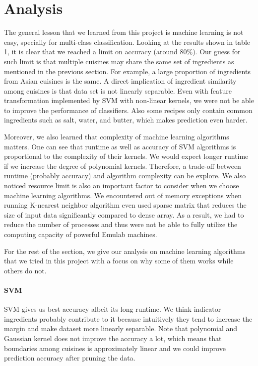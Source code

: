 \section{Analysis}
The general lesson that we learned from this project is machine learning is not easy, specially for multi-class classification. Looking at the results shown in table 1, it is clear that we reached a limit on accuracy (around 80\%). Our guess for such limit is that multiple cuisines may share the same set of ingredients as mentioned in the previous section. For example, a large proportion of ingredients from Asian cuisines is the same. A direct implication of ingredient similarity among cuisines is that data set is not linearly separable. Even with feature transformation implemented by SVM with non-linear kernels, we were not be able to improve the performance of classifiers. Also some recipes only contain common ingredients such as salt, water, and butter, which makes prediction even harder.

Moreover, we also learned that complexity of machine learning algorithms matters. One can see that runtime as well as accuracy of SVM algorithms is proportional to the complexity of their kernels. We would expect longer runtime if we increase the degree of polynomial kernels. Therefore, a trade-off between runtime (probably accuracy) and algorithm complexity can be explore. We also noticed resource limit is also an important factor to consider when we choose machine learning algorithms. We encountered out of memory exceptions when running K-nearest neighbor algorithm even used sparse matrix that reduces the size of input data significantly compared to dense array. As a result, we had to reduce the number of processes and thus were not be able to fully utilize the computing capacity of powerful Emulab machines.

For the rest of the section, we give our analysis on machine learning algorithms that we tried in this project with a focus on why some of them works while others do not.

\paragraph{SVM} SVM gives us best accuracy albeit its long runtime. We think indicator ingredients probably contribute to it because intuitively they tend to increase the margin and make dataset more linearly separable. Note that polynomial and Gaussian kernel does not improve the accuracy a lot, which means that boundaries among cuisines is approximately linear and we could improve prediction accuracy after pruning the data. 

